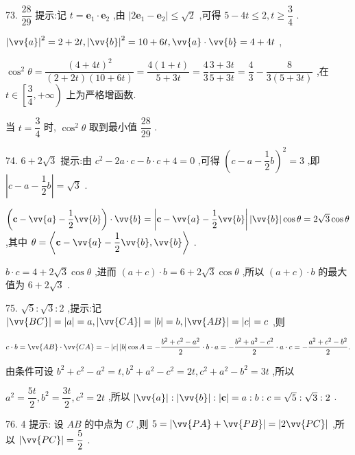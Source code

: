 73. $\dfrac{28}{29}$ 提示:记 $t = {\mathbf{e}}_{1} \cdot  {\mathbf{e}}_{2}$ ,由 $\left| {2{\mathbf{e}}_{1} - {\mathbf{e}}_{2}}\right|  \leq  \sqrt{2}$ ,可得 $5 - {4t} \leq  2,t \geq  \dfrac{3}{4}$ .

${\left| \vv{a}\right| }^{2} = 2 + {2t},{\left| \vv{b}\right| }^{2} = {10} + {6t},\vv{a} \cdot  \vv{b} = 4 + {4t}$ ,

${\cos }^{2}\theta  = \dfrac{{\left( 4 + 4t\right) }^{2}}{\left( {2 + {2t}}\right) \left( {{10} + {6t}}\right) } = \dfrac{4\left( {1 + t}\right) }{5 + {3t}} = \dfrac{4}{3}\dfrac{3 + {3t}}{5 + {3t}} = \dfrac{4}{3} - \dfrac{8}{3\left( {5 + {3t}}\right) }$ ,在 $t \in  \left\lbrack  {\dfrac{3}{4}, + \infty }\right)$ 上为严格增函数.

当 $t = \dfrac{3}{4}$ 时, ${\cos }^{2}\theta$ 取到最小值 $\dfrac{28}{29}$ .

74. $6 + 2\sqrt{3}$ 提示:由 ${c}^{2} - {2a} \cdot  c - b \cdot  c + 4 = 0$ ,可得 ${\left( c - a - \dfrac{1}{2}b\right) }^{2} = 3$ ,即 $\left| {c - a - \dfrac{1}{2}b}\right|  = \sqrt{3}$ .

$\left( {\mathbf{c} - \vv{a} - \dfrac{1}{2}\vv{b}}\right)  \cdot  \vv{b} = \left| {\mathbf{c} - \vv{a} - \dfrac{1}{2}\vv{b}}\right| \left| \vv{b}\right| \cos \theta  = 2\sqrt{3}\cos \theta$ ,其中 $\theta  = \left\langle  {\mathbf{c} - \vv{a} - \dfrac{1}{2}\vv{b},\vv{b}}\right\rangle$ .

$b \cdot  c = 4 + 2\sqrt{3}\cos \theta$ ,进而 $\left( {a + c}\right)  \cdot  b = 6 + 2\sqrt{3}\cos \theta$ ,所以 $\left( {a + c}\right)  \cdot  b$ 的最大值为 $6 + 2\sqrt{3}$ .

75. $\sqrt{5} : \sqrt{3} : 2$ ,提示:记 $\left| \vv{BC}\right|  = \left| a\right|  = a,\left| \vv{CA}\right|  = \left| b\right|  = b,\left| \vv{AB}\right|  = \left| c\right|  = c$ ,则

$c \cdot  b = \vv{AB} \cdot  \vv{CA} =  - \left| c\right| \left| b\right| \cos A =  - \dfrac{{b}^{2} + {c}^{2} - {a}^{2}}{2} \cdot  b \cdot  a =  - \dfrac{{b}^{2} + {a}^{2} - {c}^{2}}{2} \cdot  a \cdot  c =  - \dfrac{{a}^{2} + {c}^{2} - {b}^{2}}{2}.$

由条件可设 ${b}^{2} + {c}^{2} - {a}^{2} = t,{b}^{2} + {a}^{2} - {c}^{2} = {2t},{c}^{2} + {a}^{2} - {b}^{2} = {3t}$ ,所以

${a}^{2} = \dfrac{5t}{2},{b}^{2} = \dfrac{3t}{2},{c}^{2} = {2t}$ ,所以 $\left| \vv{a}\right|  : \left| \vv{b}\right|  : \left| \mathbf{c}\right|  = a : b : c = \sqrt{5} : \sqrt{3} : 2$ .

76. 4 提示: 设 ${AB}$ 的中点为 $C$ ,则 $5 = \left| {\vv{PA} + \vv{PB}}\right|  = \left| {2\vv{PC}}\right|$ ,所以 $\left| \vv{PC}\right|  = \dfrac{5}{2}$ .

